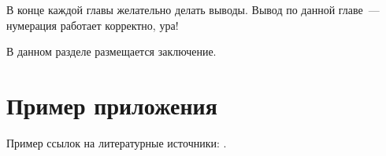 \documentclass[annotation,times,page4]{itmo-student-thesis}
\begin{document}
\chapterconclusion

В конце каждой главы желательно делать выводы. Вывод по данной главе~--- нумерация работает корректно, ура!

\startconclusionpage

В данном разделе размещается заключение.

\printbibliography[heading=trueHeading]

\appendix

\chapter{Пример приложения}

Пример ссылок на литературные источники: \cite{example-english, example-russian}.
\end{document}
